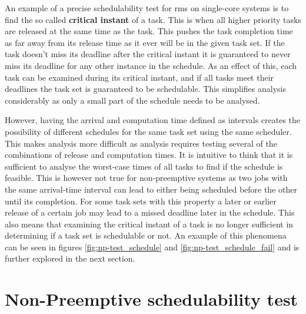 \documentclass{kththesis}
\begin{document}
An example of a precise schedulability test for \acrshort{rms} on single-core systems is to find the
so called \textbf{critical instant} of a task. This is when all higher priority tasks are released
at the same time as the task. This pushes the task completion time as far away from its release time
as it ever will be in the given task set. If the task doesn't miss its deadline after the critical
instant it is guaranteed to never miss its deadline for any other instance in the schedule. As an
effect of this, each task can be examined during its critical instant, and if all tasks meet their
deadlines the task set is guaranteed to be schedulable. This simplifies analysis considerably as
only a small part of the schedule needs to be analysed.

However, having the arrival and computation time defined as intervals creates the possibility of
different schedules for the same task set using the same scheduler. This makes analysis more
difficult as analysis requires testing several of the combinations of release and computation times.
It is intuitive to think that it is sufficient to analyse the worst-case times of all tasks to find
if the schedule is feasible. This is however not true for non-preemptive systems as two jobs with
the same arrival-time interval can lead to either being scheduled before the other until its
completion. For some task sets with this property a later or earlier release of a certain job may
lead to a missed deadline later in the schedule. This also means that examining the critical instant
of a task is no longer sufficient in determining if a task set is schedulable or not. An example of
this phenomena can be seen in figures \ref{fig:np-test_schedule} and \ref{fig:np-test_schedule_fail} and is further explored in the next
section.


\section{Non-Preemptive schedulability test} \label{sec:np-test}
\end{document}

